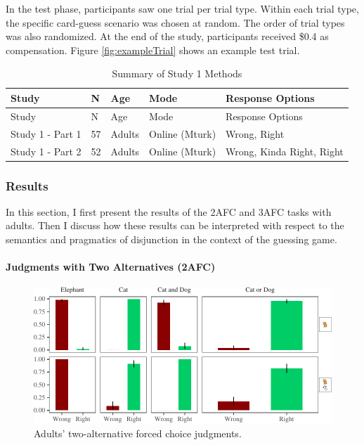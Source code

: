 \documentclass[man]{apa6}
\theoremstyle{definition}
\theoremstyle{definition}
\theoremstyle{definition}
\theoremstyle{remark}
\begin{document}
In the test phase, participants saw one trial per trial type. Within
each trial type, the specific card-guess scenario was chosen at random.
The order of trial types was also randomized. At the end of the study,
participants received \$0.4 as compensation. Figure
\ref{fig:exampleTrial} shows an example test trial.

\begin{longtable}[]{@{}lllll@{}}
\caption{\label{tab:study1info} Summary of Study 1 Methods}\tabularnewline
\toprule
Study & N & Age & Mode & Response Options\tabularnewline
\midrule
\endfirsthead
\toprule
Study & N & Age & Mode & Response Options\tabularnewline
\midrule
\endhead
Study 1 - Part 1 & 57 & Adults & Online (Mturk) & Wrong,
Right\tabularnewline
Study 1 - Part 2 & 52 & Adults & Online (Mturk) & Wrong, Kinda Right,
Right\tabularnewline
\bottomrule
\end{longtable}

\subsubsection{Results}\label{results}

In this section, I first present the results of the 2AFC and 3AFC tasks
with adults. Then I discuss how these results can be interpreted with
respect to the semantics and pragmatics of disjunction in the context of
the guessing game.

\paragraph{Judgments with Two Alternatives
(2AFC)}\label{judgments-with-two-alternatives-2afc}

\begin{figure}[t]

{\centering \includegraphics{figs/binaryAdultsPlot-1} 

}

\caption{Adults' two-alternative forced choice judgments.}\label{fig:binaryAdultsPlot}
\end{figure}
\end{document}
